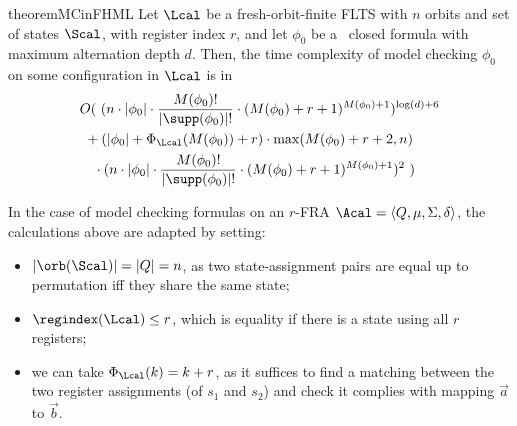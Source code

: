 

\begin{restatable}{theorem}{MCinFHML}\label{thm:MCinFHML}
  Let $\Lcal$ be a fresh-orbit-finite FLTS with $n$ orbits and set of states $\Scal$, with register index $r$,
  and let $\phi_0$ be a \fhml\ closed formula with maximum alternation depth $d$. 
    Then, the time complexity of model checking $\phi_0$ on some configuration in $\Lcal$ is in
	\begin{align*}
		&O(\ (n \cdot|\phi_0|\cdot \frac{M(\phi_0)!}{|\supp(\phi_0)|!}\cdot (M(\phi_0)+r + 1)^{M(\phi_0) + 1})^{\log(d) + 6}
		\\ &\ + 
		(|\phi_0| + \Phi_\Lcal(M(\phi_0)) +r)
		\cdot
		\max(M(\phi_0)+r + 2, n
		)\\&\quad \cdot 
		(n \cdot|\phi_0|\cdot \frac{M(\phi_0)!}{|\supp(\phi_0)|!}\cdot (M(\phi_0)+r + 1)^{M(\phi_0) + 1})
		^2\
		)
	\end{align*}
\end{restatable}

\begin{remark}
In the case of model checking formulas on an $r$-FRA $\Acal=\langle Q,\mu,\Sigma,\delta\rangle$, the calculations above are adapted by setting:
\begin{itemize}
\item $|\orb(\Scal)|=|Q|=n$, as two state-assignment pairs are equal up to permutation iff they share the same state;
\item $\regindex(\Lcal)\leq r$, which is equality if there is a state using all $r$  registers;
  \item we can take $\Phi_\Lcal(k)=k+r$, as it suffices to find a matching between the two register assignments (of $s_1$ and $s_2$) and check it complies with mapping $\vec a$ to $\vec b$.
  \end{itemize}
\end{remark}


